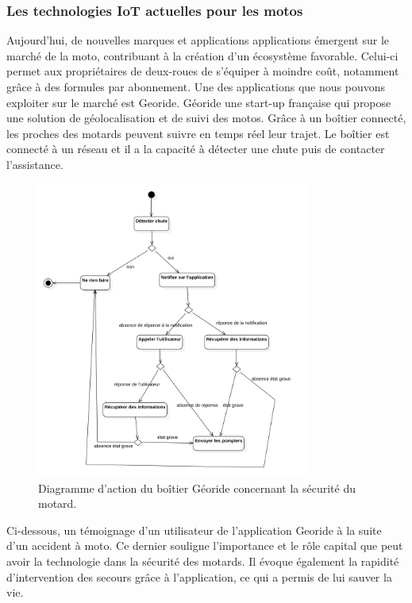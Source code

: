 \subsubsection{Les technologies IoT actuelles pour les motos}
Aujourd’hui, de nouvelles marques et applications \cite{iot_accessoire_moto} applications émergent sur le marché de la moto, contribuant à la création d’un écosystème favorable. Celui-ci permet aux propriétaires de deux-roues de s’équiper à moindre coût, notamment grâce à des formules par abonnement. Une des applications que nous pouvons exploiter sur le marché est Georide. Géoride une start-up française qui propose une solution de géolocalisation et de suivi des motos. Grâce à un boîtier connecté, les proches des motards peuvent suivre en temps réel leur trajet. Le boîtier est connecté à un réseau et il a la capacité à détecter une chute puis de contacter l'assistance. 
\begin{figure}[H]
    \centering
    \includegraphics[width=0.8\textwidth]{images/diag_etat_georide.png} 
    \caption{Diagramme d'action du boîtier Géoride concernant la sécurité du motard.}
\end{figure}
Ci-dessous, un témoignage d'un utilisateur de l'application Georide à la suite d'un accident à moto. Ce dernier souligne l'importance et le rôle capital que peut avoir la technologie dans la sécurité des motards. Il évoque également la rapidité d'intervention des secours grâce à l'application, ce qui a permis de lui sauver la vie.
